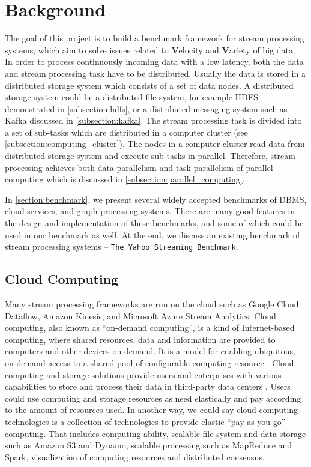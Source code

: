 \chapter{Background}
\label{chapter:background}
The goal of this project is to build a benchmark framework for stream processing systems, which aim to solve issues related to \textbf{V}elocity and \textbf{V}ariety of big data \cite{GameChanger}. In order to process continuously incoming data with a low latency, both the data and stream processing task have to be distributed. Usually the data is stored in a distributed storage system which consists of a set of data nodes. A distributed storage system could be a distributed file system, for example HDFS demonstrated in \cref{subsection:hdfs}, or a distributed messaging system such as Kafka discussed in \cref{subsection:kafka}. The stream processing task is divided into a set of sub-tasks which are distributed in a computer cluster (see \cref{subsection:computing_cluster}). The nodes in a computer cluster read data from distributed storage system and execute sub-tasks in parallel. Therefore, stream processing achieves both data parallelism and task parallelism of parallel computing which is discussed in \cref{subsection:parallel_computing}.
 
In \cref{section:benchmark}, we present several widely accepted benchmarks of DBMS, cloud services, and graph processing systems. There are many good features in the design and implementation of these benchmarks, and some of which could be used in our benchmark as well. At the end, we discuss an existing benchmark of stream processing systems -- \texttt{The Yahoo Streaming Benchmark}. 
 

\section{Cloud Computing}
Many stream processing frameworks are run on the cloud such as Google Cloud Dataflow, Amazon Kinesis, and Microsoft Azure Stream Analytics. Cloud computing, also known as ``on-demand computing'', is a kind of Internet-based computing, where shared resources, data and information are provided to computers and other devices on-demand. It is a model for enabling ubiquitous, on-demand access to a shared pool of configurable computing resource \cite{neto2011demystifying, mell2011nist}. Cloud computing and storage solutions provide users and enterprises with various capabilities to store and process their data in third-party data centers \cite{haghighat2015cloudid}. Users could use computing and storage resources as need elastically and pay according to the amount of resources used. In another way, we could say cloud computing technologies is a collection of technologies to provide elastic ``pay as you go'' computing. That includes computing ability, scalable file system and data storage such as Amazon S3 and Dynamo, scalable processing such as MapReduce and Spark, visualization of computing resources and distributed consensus. 

